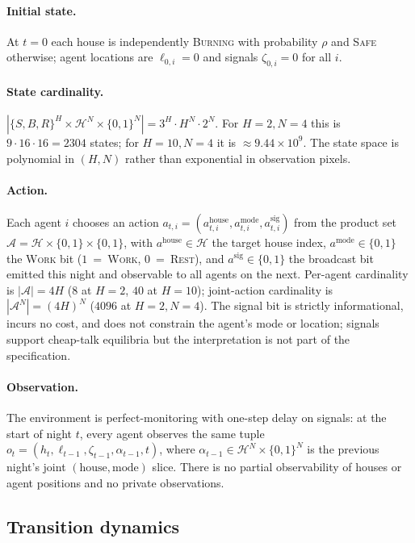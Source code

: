\documentclass{anvil-paper}
\begin{document}
\paragraph{Initial state.} At $t{=}0$ each house is independently
\textsc{Burning} with probability $\rho$ and \textsc{Safe} otherwise;
agent locations are $\ell_{0,i}{=}0$ and signals $\zeta_{0,i}{=}0$ for
all $i$.

\paragraph{State cardinality.}
$|\{S,B,R\}^H\times\mathcal{H}^N\times\{0,1\}^N|=3^H\cdot H^N\cdot 2^N$.
For $H{=}2,N{=}4$ this is $9\cdot 16\cdot 16=2304$ states; for
$H{=}10,N{=}4$ it is $\approx 9.44\times 10^{9}$. The state space is
polynomial in $(H,N)$ rather than exponential in observation pixels.

\paragraph{Action.} Each agent $i$ chooses an action $a_{t,i}=
(a_{t,i}^{\text{house}},a_{t,i}^{\text{mode}},a_{t,i}^{\text{sig}})$
from the product set $\mathcal{A}=\mathcal{H}\times\{0,1\}\times\{0,1\}$,
with $a^{\text{house}}\in\mathcal{H}$ the target house index,
$a^{\text{mode}}\in\{0,1\}$ the \textsc{Work} bit ($1$~=~\textsc{Work},
$0$~=~\textsc{Rest}), and $a^{\text{sig}}\in\{0,1\}$ the broadcast bit
emitted this night and observable to all agents on the next. Per-agent
cardinality is $|\mathcal{A}|=4H$ ($8$ at $H{=}2$, $40$ at $H{=}10$);
joint-action cardinality is $|\mathcal{A}^N|=(4H)^N$ ($4096$ at
$H{=}2,N{=}4$). The signal bit is strictly informational, incurs no
cost, and does not constrain the agent's mode or location; signals
support cheap-talk equilibria but the interpretation is not part of the
specification.

\paragraph{Observation.} The environment is perfect-monitoring with
one-step delay on signals: at the start of night $t$, every agent
observes the same tuple
$o_t=(h_t,\ell_{t-1},\zeta_{t-1},\alpha_{t-1},t)$, where
$\alpha_{t-1}\in\mathcal{H}^N\times\{0,1\}^N$ is the previous night's
joint $(\text{house},\text{mode})$ slice. There is no partial
observability of houses or agent positions and no private observations.

\subsection{Transition dynamics}
\label{app:envspec:dynamics}
\end{document}
